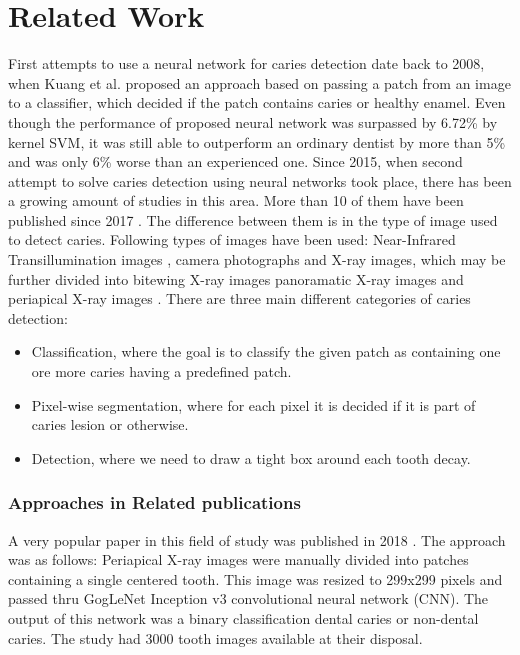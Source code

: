 \chapter{Related Work}
First attempts to use a neural network for caries detection date back to 2008, when Kuang et al. \cite{Kuang2008} proposed an approach based on passing a patch from an image to a classifier, which decided if the patch contains caries or healthy enamel. Even though the performance of proposed neural network was surpassed by 6.72\% by kernel SVM, it was still able to outperform an ordinary dentist by more than 5\% and was only 6\% worse than an experienced one. Since 2015, when second attempt to solve caries detection using neural networks took place, there has been a growing amount of studies in this area. More than 10 of them have been published since 2017 \cite{PradosPrivado2020}. The difference between them is in the type of image used to detect caries. Following types of images have been used: Near-Infrared Transillumination images \cite{Casalegno2019,Schwendicke2020}, camera photographs \cite{Moutselos2019} and X-ray images, which may be further divided into bitewing X-ray images \cite{Moran2021, Cantu2020, Bayrakdar2021, Mao2021, Srivastava2017} panoramatic X-ray images \cite{Lian2021} and periapical X-ray images \cite{Lee2018}.
There are three main different categories of caries detection:
\begin{itemize}
    \item Classification, where the goal is to classify the given patch as containing one ore more caries having a predefined patch.
    \item Pixel-wise segmentation, where for each pixel it is decided if it is part of caries lesion or otherwise.
    \item Detection, where we need to draw a tight box around each tooth decay.
\end{itemize}
\subsection{Approaches in Related publications}
A very popular paper in this field of study was published in 2018 \cite{Lee2018}. The approach was as follows: Periapical X-ray images were manually divided into patches containing a single centered tooth. This image was resized to 299x299 pixels and passed thru GogLeNet Inception v3 convolutional neural network (CNN). The output of this network was a binary classification dental caries or non-dental caries. The study had 3000 tooth images available at their disposal.

